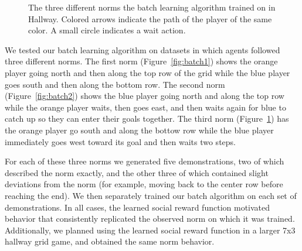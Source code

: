 \begin{figure}
\begin{subfigure}[b]{0.275\textwidth}
        \caption{}
        \label{fig:batch3}
    \end{subfigure}
    \caption{The three different norms the batch learning algorithm trained on in Hallway. Colored arrows indicate the path of the player of the same color. A small circle indicates a wait action.}\label{fig:batchRes}
\end{figure}

We tested our batch learning algorithm on datasets in which
agents followed three different norms. 
The first norm (Figure~\ref{fig:batch1}) shows the orange player going
north and then along the top row of the grid while the blue player
goes south and then along the bottom row. The second norm
(Figure~\ref{fig:batch2}) shows the blue player going north and along
the top row while the orange player waits, then goes east, and then
waits again for blue to catch up so they can enter their goals
together.  The third norm (Figure~\ref{fig:batch3}) has the orange
player go south and along the bottow row while the blue player
immediately goes west toward its goal and then waits two steps.

For each of these three norms we generated five demonstrations, two of
which described the norm exactly, and the other three of which
contained slight deviations from the norm (for example, moving back to
the center row before reaching the end). We then
separately trained our batch algorithm on each set of demonstrations.
In all cases, the learned social reward function motivated
behavior that consistently replicated the observed norm on which it
was trained. Additionally, we planned using the learned social reward
function in a larger 7x3 hallway grid game, and obtained the same norm
behavior.


